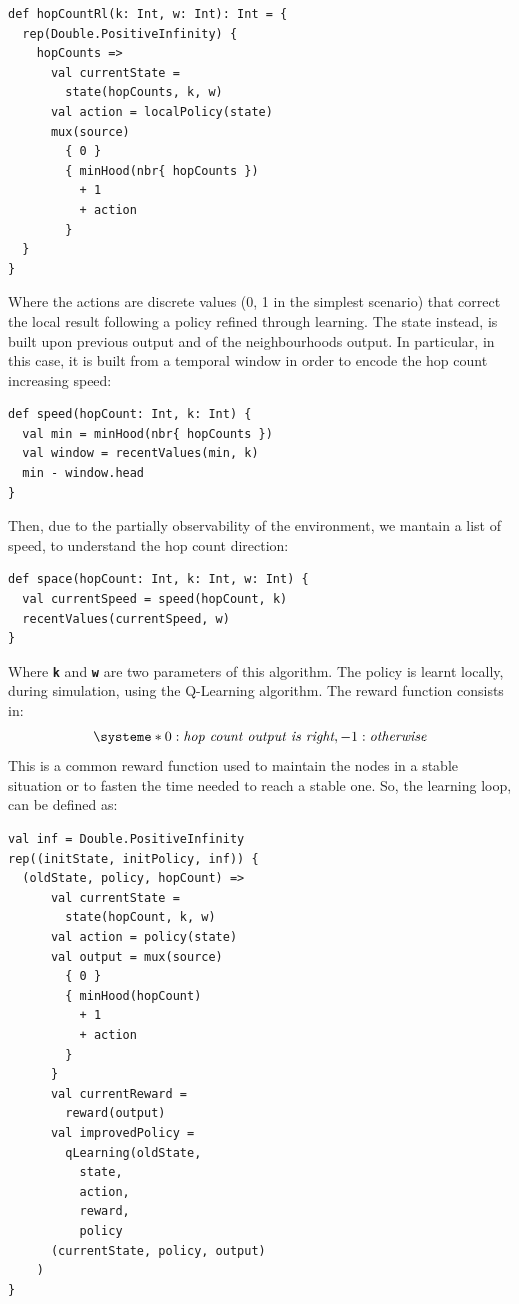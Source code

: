 \documentclass[conference]{IEEEtran}
\begin{document}
 \begin{verbatim}
def hopCountRl(k: Int, w: Int): Int = {
  rep(Double.PositiveInfinity) { 
    hopCounts => 
      val currentState = 
        state(hopCounts, k, w)
      val action = localPolicy(state)
      mux(source) 
        { 0 } 
        { minHood(nbr{ hopCounts }) 
          + 1 
          + action
        } 
  }
}
\end{verbatim}

Where the actions are discrete values (0, 1 in the simplest scenario) that correct the local result following a policy refined through learning.
%
The state instead, is built upon previous output and of the neighbourhoods output.
 In particular, in this case, it is built from a temporal window in order to encode the hop count increasing speed:
\begin{verbatim}
def speed(hopCount: Int, k: Int) {
  val min = minHood(nbr{ hopCounts })
  val window = recentValues(min, k)
  min - window.head 
}
\end{verbatim}
Then, due to the partially observability of the environment, we mantain a 
 list of speed, to understand the hop count direction:

 \begin{verbatim}
def space(hopCount: Int, k: Int, w: Int) {
  val currentSpeed = speed(hopCount, k)
  recentValues(currentSpeed, w)
}
\end{verbatim}

Where \textbf{\texttt{k}} and \textbf{\texttt{w}} are two parameters of this algorithm.
%
The policy is learnt locally, during simulation, using the Q-Learning algorithm. 
 The reward function consists in: 
\[
\systeme*{0 : \textit{hop count output is right}, -1 : \textit{otherwise}}
\]
This is a common reward function used to maintain the nodes in a stable situation or to
 fasten the time needed to reach a stable one.
%
So, the learning loop, can be defined as:
\begin{verbatim}
val inf = Double.PositiveInfinity
rep((initState, initPolicy, inf)) {
  (oldState, policy, hopCount) => 
      val currentState = 
        state(hopCount, k, w)
      val action = policy(state)
      val output = mux(source) 
        { 0 } 
        { minHood(hopCount) 
          + 1 
          + action
        } 
      }
      val currentReward = 
        reward(output)
      val improvedPolicy = 
        qLearning(oldState, 
          state, 
          action, 
          reward,
          policy
      (currentState, policy, output)
    )
}
\end{verbatim}
\end{document}
